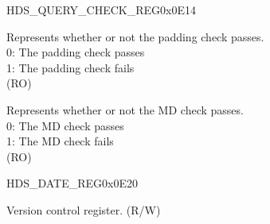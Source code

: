 \begin{register}{H}{DS\_QUERY\_CHECK\_REG}{0x0E14}\label{regdesc:DSQUERYCHECKREG}
%
%
%
\regnewline%
\begin{regdesc}\begin{reglist}
\item [DS\_PADDING\_BAD] Represents whether or not the padding check passes.\\
0: The padding check passes\\
1: The padding check fails\\
(RO)
\item [DS\_MD\_ERROR] Represents whether or not the MD check passes.\\
0: The MD check passes\\
1: The MD check fails\\
(RO)
\end{reglist}\end{regdesc}
\end{register}




\begin{register}{H}{DS\_DATE\_REG}{0x0E20}\label{regdesc:DSDATEREG}
%
%
\regnewline%
\begin{regdesc}\begin{reglist}
\item [DS\_DATE] Version control register. (R/W)
\end{reglist}\end{regdesc}
\end{register}
